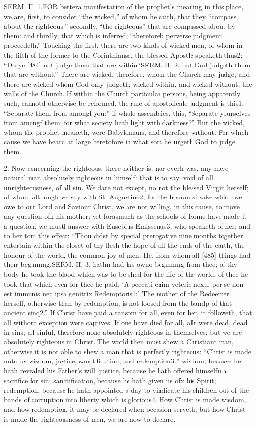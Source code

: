 SERM. II. 1.FOR bettera manifestation of the prophet’s meaning in this place, we are, first, to consider “the wicked,” of whom he saith, that they “compass about the righteous:” secondly, “the righteous” that are compassed about by them: and thirdly, that which is inferred; “thereforeb perverse judgment proceedeth.” Touching the first, there are two kinds of wicked men, of whom in the fifth of the former to the Corinthiansc, the blessed Apostle speaketh thus2: “Do ye [484] not judge them that are within?SERM. II. 2. but God judgeth them that are without.” There are wicked, therefore, whom the Church may judge, and there are wicked whom God only judgeth; wicked within, and wicked without, the walls of the Church. If within the Church particular persons, being apparently such, cannotd otherwise be reformed, the rule of apostolicale judgment is this1, “Separate them from amongf you:” if whole assemblies, this, “Separate yourselves from amongf them: for what society hath light with darkness?” But the wicked, whom the prophet meaneth, were Babylonians, and therefore without. For which cause we have heard at large heretofore in what sort he urgeth God to judge them.

2. Now concerning the righteous, there neither is, nor everh was, any mere natural man absolutely righteous in himself: that is to say, void of all unrighteousness, of all sin. We dare not except, no not the blessed Virgin herself; of whom although we say with St. Augustine2, for the honour’si sake which we owe to our Lord and Saviour Christ, we are not willing, in this cause, to move any question ofk his mother; yet forasmuch as the schools of Rome have made it a question, we mustl answer with Eusebius Emissenus3, who speaketh of her, and to her tom this effect: “Thou didst by special prerogative nine months together entertain within the closet of thy flesh the hope of all the ends of the earth, the honour of the world, the common joy of men. He, from whom all [485] things had their beginning,SERM. II. 3. hathn had his owno beginning from thee; of thy body he took the blood which was to be shed for the life of the world; of thee he took that which even for thee he paid. ‘A peccati enim veteris nexu, per se non est immunis nec ipsa genitrix Redemptoris1:’ The mother of the Redeemer herself, otherwise than by redemption, is not loosed from the bandp of that ancient sinq2.” If Christ have paid a ransom for all, even for her, it followeth, that all without exception were captives. If one have died for all, allr were dead, dead in sins; all sinful, therefore none absolutely righteous in themselves; but we are absolutely righteous in Christ. The world then must shew a Christiant man, otherwise it is not able to shew a man that is perfectly righteous: “Christ is made unto us wisdom, justice, sanctification, and redemption3:” wisdom, because he hath revealed his Father’s will; justice, because he hath offered himselfu a sacrifice for sin; sanctification, because he hath given us ofx his Spirit; redemption, because he hath appointed a day to vindicate his children out of the bands of corruption into liberty which is glorious4. How Christ is made wisdom, and how redemption, it may be declared when occasion serveth; but how Christ is made the righteousness of men, we are now to declare.

